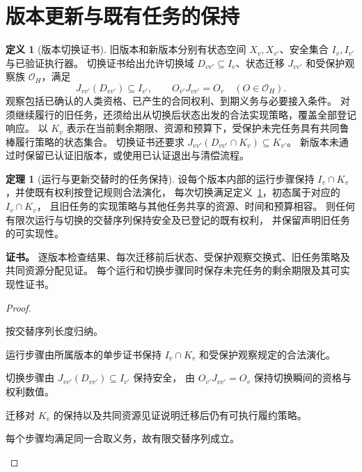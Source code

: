 \documentclass[UTF8,12pt,a4paper,openany,fontset=none,zihao=false]{ctexrep}
\theoremstyle{definition}
\newtheorem{definition}{定义}[chapter]
\newtheorem{theorem}{定理}[chapter]
\newenvironment{certificate}{\par\noindent\textbf{证书。}\ignorespaces}{\par}
\newcommand{\1}{\mathbf 1}
\begin{document}
\section{版本更新与既有任务的保持}

\begin{definition}[版本切换证书]
\label{tra:update-certificate}
旧版本和新版本分别有状态空间 \(X_v,X_{v'}\)、安全集合 \(I_v,I_{v'}\) 与已验证执行器。
切换证书给出允许切换域 \(D_{vv'}\subseteq I_v\)、状态迁移 \(J_{vv'}\) 和受保护观察族 \(\mathcal O_H\)，满足
\[
J_{vv'}(D_{vv'})\subseteq I_{v'},
\qquad O_{v'}J_{vv'}=O_v\quad(O\in\mathcal O_H).
\]
观察包括已确认的人类资格、已产生的合同权利、到期义务与必要接入条件。
对须继续履行的旧任务，还须给出从切换后状态出发的合法实现策略，覆盖全部登记响应。
以 \(K_v\) 表示在当前剩余期限、资源和预算下，受保护未完任务具有共同鲁棒履行策略的状态集合。
切换证书还要求 \(J_{vv'}(D_{vv'}\cap K_v)\subseteq K_{v'}\)。
新版本未通过时保留已认证旧版本，或使用已认证退出与清偿流程。
\end{definition}

\begin{theorem}[运行与更新交替时的任务保持]
\label{tra:update-invariance}
设每个版本内部的运行步骤保持 \(I_v\cap K_v\)，并使既有权利按登记规则合法演化，
每次切换满足定义~\ref{tra:update-certificate}，初态属于对应的 \(I_v\cap K_v\)，
且旧任务的实现策略与其他任务共享的资源、时间和预算相容。
则任何有限次运行与切换的交替序列保持安全及已登记的既有权利，
并保留声明旧任务的可实现性。
\end{theorem}
\begin{certificate}
逐版本检查结果、每次迁移前后状态、受保护观察交换式、旧任务策略及共同资源分配见证。
每个运行和切换步骤同时保存未完任务的剩余期限及其可实现性证书。
\end{certificate}
\begin{proof}
\begin{semanticsteps}
\item 按交替序列长度归纳。
\item 运行步骤由所属版本的单步证书保持 \(I_v\cap K_v\) 和受保护观察规定的合法演化。
\item 切换步骤由 \(J_{vv'}(D_{vv'})\subseteq I_{v'}\) 保持安全，
由 \(O_{v'}J_{vv'}=O_v\) 保持切换瞬间的资格与权利数值。
\item 迁移对 \(K_v\) 的保持以及共同资源见证说明迁移后仍有可执行履约策略。
\item 每个步骤均满足同一合取义务，故有限交替序列成立。
\end{semanticsteps}
\end{proof}
\end{document}
